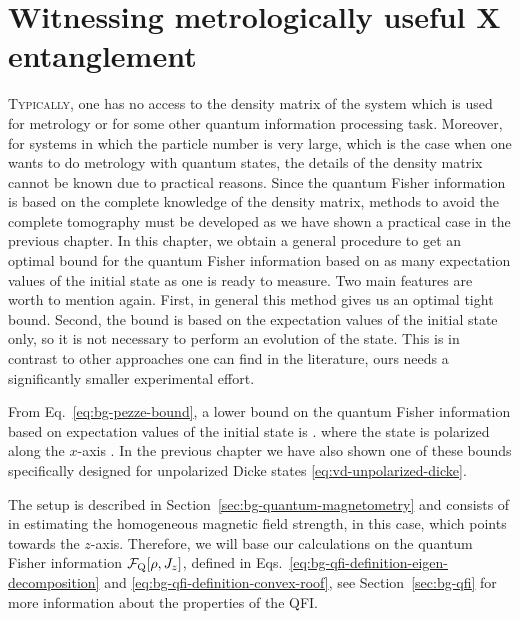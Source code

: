 \section[Witnessing metrologically useful entanglement]
{Witnessing metrologically useful {\color{grey} X} entanglement}

\label{sec:lt}


\lettrine[lines=2, findent=3pt,nindent=0pt]{T}{ypically}, one has no access to the density matrix of the system which is used for metrology or for some other quantum information processing task.
Moreover, for systems in which the particle number is very large, which is the case when one wants to do metrology with quantum states, the details of the density matrix cannot be known due to practical reasons.
Since the quantum Fisher information is based on the complete knowledge of the density matrix, methods to avoid the complete tomography must be developed as we have shown a practical case in the previous chapter.
In this chapter, we obtain a general procedure to get an optimal bound for the quantum Fisher information based on as many expectation values of the initial state as one is ready to measure.
Two main features are worth to mention again.
First, in general this method gives us an optimal tight bound.
Second, the bound is based on the expectation values of the initial state only, so it is not necessary to perform an evolution of the state.
This is in contrast to other approaches one can find in the literature, ours needs a significantly smaller experimental effort.

From Eq.~\eqref{eq:bg-pezze-bound}, a lower bound on the quantum Fisher information based on expectation values of the initial state is
\be
   \geqslant {}.
\ee
where the state is polarized along the $x$-axis \cite{Pezze2009}.
In the previous chapter we have also shown one of these bounds specifically designed for unpolarized Dicke states \eqref{eq:vd-unpolarized-dicke}.

The setup is described in Section~\ref{sec:bg-quantum-magnetometry} and consists of in estimating the homogeneous magnetic field strength, in this case, which points towards the $z$-axis.
Therefore, we will base our calculations on the quantum Fisher information $\mathcal{F}_{\textnormal{Q}}[{\textstyle \rho, J_z}]$, defined in Eqs.~\eqref{eq:bg-qfi-definition-eigen-decomposition} and \eqref{eq:bg-qfi-definition-convex-roof}, see Section~\ref{sec:bg-qfi} for more information about the properties of the QFI.

